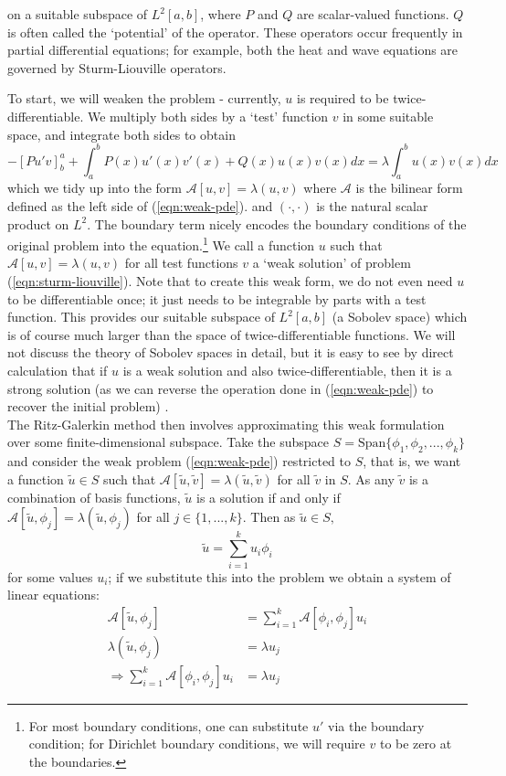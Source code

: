 \documentclass[../main.tex]{subfiles}
\begin{document}
on a suitable subspace of $L^2[a, b]$, where $P$ and $Q$ are scalar-valued functions. $Q$ is often called the `potential' of the operator. These operators occur frequently in partial differential equations; for example, both the heat and wave equations are governed by Sturm-Liouville operators.

To start, we will weaken the problem - currently, $u$ is required to be twice-differentiable. We multiply both sides by a `test' function $v$ in some suitable
space, and integrate both sides to obtain
\begin{equation}\label{eqn:weak-pde}
-[Pu'v]^a_b + \int_a^b P(x) u'(x) v'(x) + Q(x) u(x) v(x) dx = \lambda \int_a^b u(x) v(x) dx
\end{equation}
which we tidy up into the form $\mathcal{A}[u, v] = \lambda (u, v)$ where $\mathcal{A}$ is the bilinear form defined as the left side of (\ref{eqn:weak-pde}). and $(\cdot, \cdot)$ is the natural scalar product on $L^2$. The boundary term nicely encodes the boundary conditions of the original problem
into the equation.\footnote{For most boundary conditions, one can substitute $u'$ via the boundary condition; for Dirichlet boundary conditions, we will require $v$ to be zero at the boundaries.}
We call a function $u$ such that $\mathcal{A}[u, v] = \lambda (u, v)$ for all test functions $v$ a `weak solution' of problem (\ref{eqn:sturm-liouville}).
Note that to create this weak form, we do not even need $u$ to be differentiable once; it just needs to
be integrable by parts with a test function. This provides our suitable subspace of $L^2[a, b]$ (a Sobolev space) which is of course much larger than the space of twice-differentiable functions. We will not discuss the theory of Sobolev spaces in detail, but it is easy to see by direct calculation that if $u$ is a weak solution and also twice-differentiable, then it
is a strong solution (as we can reverse the operation done in (\ref{eqn:weak-pde}) to recover the initial problem) \cite{brezis2011functional}.\\

The Ritz-Galerkin method then involves approximating this weak formulation over some finite-dimensional subspace. Take the subspace $S = \text{Span}\{\phi_1, \phi_2, ..., \phi_k\}$ and consider the weak problem (\ref{eqn:weak-pde}) restricted to $S$, that is, we want a function $\tilde{u} \in S$ such that 
$\mathcal{A}[\tilde{u}, \tilde{v}] = \lambda (\tilde{u}, \tilde{v})$ for all $\tilde{v}$ in $S$. As any $\tilde{v}$ is a combination
of basis functions, $\tilde{u}$ is a solution if and only if $\mathcal{A}[\tilde{u}, \phi_j] = \lambda (\tilde{u}, \phi_j)$ for all $j \in \{1, ..., k\}$. Then as $\tilde{u} \in S,$
$$\tilde{u} = \sum_{i=1}^k u_i \phi_i$$
for some values $u_i$; if we substitute this into the problem we obtain a system of linear equations:
\begin{align*}
\mathcal{A}[\tilde{u}, \phi_j] & = \sum_{i=1}^k \mathcal{A}[\phi_i, \phi_j] u_i \\
\lambda (\tilde{u}, \phi_j) & = \lambda u_j \\
\Rightarrow \sum_{i=1}^k \mathcal{A}[\phi_i, \phi_j] u_i & = \lambda u_j
\end{align*}
\end{document}
